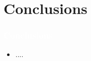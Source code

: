 \section{Conclusions}

\begin{frame}
  \frametitle{\textcolor{white}{\bf Conclusions}}


  \begin{itemize}
    \item ....
  \end{itemize}

\end{frame}
